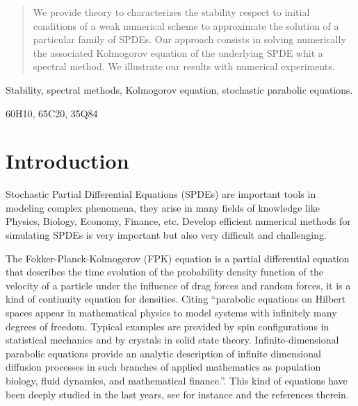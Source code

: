 \documentclass[review,onefignum,onetabnum]{siamart190516}
\begin{document}
\maketitle
%

\begin{abstract}
    We provide theory to characterizes the stability respect to initial 
    conditions of a weak numerical scheme to approximate the solution of a
    particular family of SPDEs. Our approach consists in solving 
    numerically the associated Kolmogorov equation of the underlying SPDE whit 
    a spectral method. We illustrate our results with numerical experiments.
\end{abstract}

%
\begin{keywords}
    Stability, spectral methods, Kolmogorov equation,
    stochastic parabolic equations.
\end{keywords}
%
\begin{AMS}
    60H10, 65C20, 35Q84
\end{AMS}
%
\section{Introduction}
    Stochastic Partial Differential Equations (SPDEs) are important tools in
modeling complex phenomena, they arise in many fields of knowledge like
Physics, Biology, Economy, Finance, etc. Develop efficient numerical
methods for simulating SPDEs is very important but also very difficult and
challenging.

    The  Fokker-Planck-Kolmogorov (FPK) equation is a partial differential
equation that describes the time evolution of the probability density function
of the velocity of a particle under the influence of drag forces and random
forces, it is a kind of continuity equation for densities. Citing \cite{da-za}
``parabolic equations on Hilbert spaces appear in mathematical physics to model
systems with infinitely many degrees of freedom. Typical examples are provided
by spin configurations in statistical mechanics and by crystals in solid state
theory. Infinite-dimensional parabolic equations provide an analytic description
of infinite dimensional diffusion processes in such branches of applied
mathematics as population biology, fluid dynamics, and mathematical finance.''.
This kind of equations have been deeply studied in the last years, see for
instance \cite{bo-da-ro, da-fl-ro, da} and the references therein.
\end{document}
